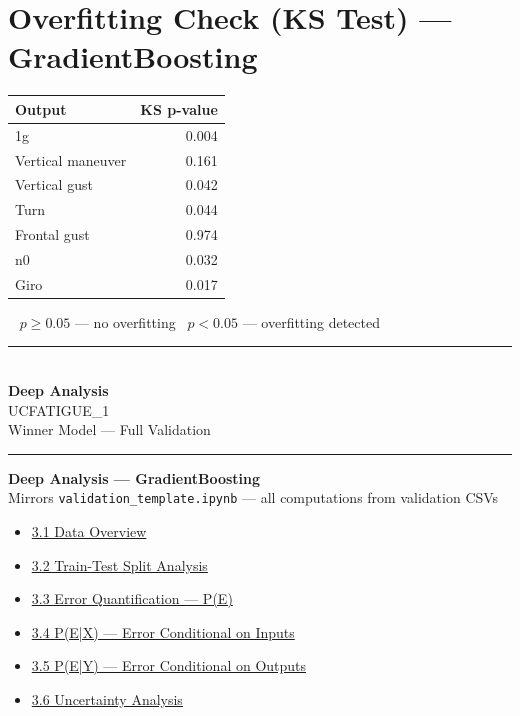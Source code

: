 \documentclass[9pt,a4paper]{article}
\begin{document}
\section{Overfitting Check (KS Test) --- GradientBoosting}
\begin{minipage}{\linewidth}
\renewcommand{\arraystretch}{1.15}
\begin{tabular}{|l|r|}
  \hline\textbf{Output} & \textbf{KS p-value} \\ \hline
  1g & \cellcolor{failred}0.004 \\ \hline
  Vertical maneuver & \cellcolor{passgreen}0.161 \\ \hline
  Vertical gust & \cellcolor{failred}0.042 \\ \hline
  Turn & \cellcolor{failred}0.044 \\ \hline
  Frontal gust & \cellcolor{passgreen}0.974 \\ \hline
  n0 & \cellcolor{failred}0.032 \\ \hline
  Giro & \cellcolor{failred}0.017 \\ \hline
\end{tabular}
\par\vspace{4pt}
{\footnotesize \colorbox{passgreen}{\ } $p\geq 0.05$ --- no overfitting\enspace \colorbox{failred}{\ } $p<0.05$ --- overfitting detected}
\end{minipage}
\clearpage
\thispagestyle{empty}
\vspace*{\fill}
\begin{center}
  \textcolor{sepgray}{\rule{0.40\linewidth}{1pt}}\\[20pt]
  {\Huge\bfseries\color{primary} Deep Analysis}\\[10pt]
  {\large\color{sepgray} UCFATIGUE\_1}\\[6pt]
  {\normalsize\color{sepgray} Winner Model --- Full Validation}\\[20pt]
  \textcolor{sepgray}{\rule{0.40\linewidth}{1pt}}
\end{center}
\vspace*{\fill}
\clearpage
\label{sec:deepanalysis}
\begin{center}
  {\normalsize\bfseries\color{primary} Deep Analysis --- GradientBoosting}\\[2pt]
  {\small\color{sepgray} Mirrors \texttt{validation\_template.ipynb} --- all computations from validation CSVs}
\end{center}
\vspace{4pt}
\begin{itemize}[leftmargin=2em,itemsep=1pt,topsep=2pt]
  \item \hyperref[sec:d1]{3.1 Data Overview}
  \item \hyperref[sec:d2]{3.2 Train-Test Split Analysis}
  \item \hyperref[sec:d3]{3.3 Error Quantification --- P(E)}
  \item \hyperref[sec:d4]{3.4 P(E|X) --- Error Conditional on Inputs}
  \item \hyperref[sec:d5]{3.5 P(E|Y) --- Error Conditional on Outputs}
  \item \hyperref[sec:d6]{3.6 Uncertainty Analysis}
\end{itemize}
\end{document}
